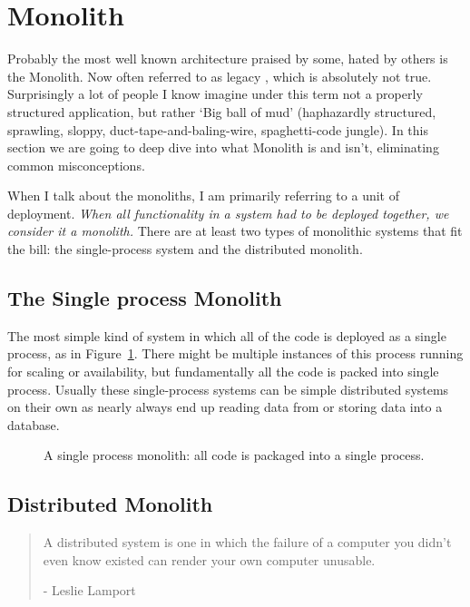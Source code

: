 
\section{Monolith}
Probably the most well known architecture praised by some, hated by others is the Monolith. Now often referred to as legacy \cite{MON_TO_MS_MONOLITH}, which is absolutely not true. Surprisingly a lot of people I know imagine under this term not a properly structured application, but rather `Big ball of mud' \cite{BIG_BALL_OF_MUD} (haphazardly structured, sprawling, sloppy, duct-tape-and-baling-wire, spaghetti-code jungle). In this section we are going to deep dive into what Monolith is and isn't, eliminating common misconceptions.

When I talk about the monoliths, I am primarily referring to a unit of deployment. \textit{When all functionality in a system had to be deployed together, we consider it a monolith.} There are at least two types of monolithic systems that fit the bill: the single-process system and the distributed monolith. \cite{MON_TO_MS_MONOLITH}

\subsection{The Single process Monolith}
The most simple kind of system in which all of the code is deployed as a single process, as in Figure~\ref{img:monolith_single_process}. There might be multiple instances of this process running for scaling or availability, but fundamentally all the code is packed into single process. Usually these single-process systems can be simple distributed systems on their own as nearly always end up reading data from or storing data into a database. \cite{MON_TO_MS_MONOLITH}

\begin{figure}
    \centering
    
    \caption{A single process monolith: all code is packaged into a single process. \cite{MON_TO_MS_MONOLITH}\label{img:monolith_single_process}}
\end{figure}

\subsection{Distributed Monolith}
\begin{quote}
    A distributed system is one in which the failure of a computer you didn’t even know existed can render your own computer unusable. \cite{lamport1987distribution}
    \begin{flushright}
        - Leslie Lamport
    \end{flushright}
\end{quote}

